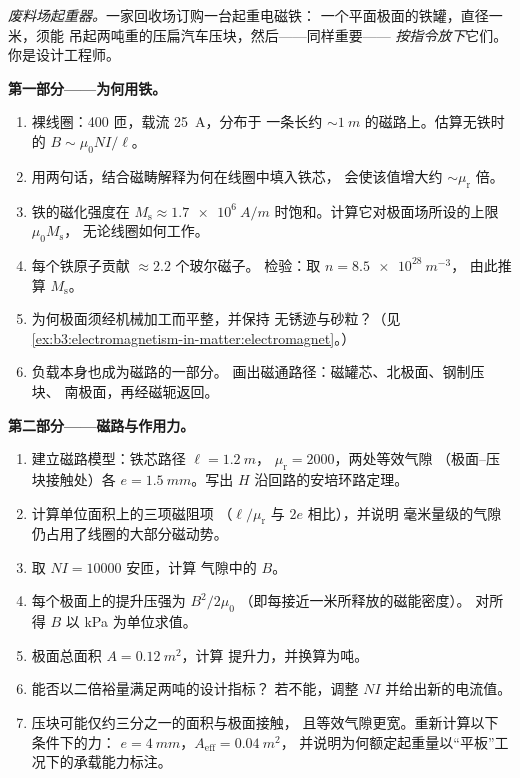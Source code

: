 \begin{problem}\label{pb:b3:electromagnetism-in-matter:1}
\emph{废料场起重器。}一家回收场订购一台起重电磁铁：
一个平面极面的铁罐，直径一米，须能
吊起两吨重的压扁汽车压块，然后——同样重要——
\emph{按指令放下}它们。你是设计工程师。

\medskip\noindent\textbf{第一部分——为何用铁。}

\begin{enumerate}
  \item 裸线圈：400 匝，载流 \qty{25}{A}，分布于
        一条长约 $\sim\qty{1}{m}$ 的磁路上。估算无铁时的 $B \sim
        \mu_0NI/\ell$。
  \item 用两句话，结合磁畴解释为何在线圈中填入铁芯，
        会使该值增大约 $\sim\mu_{\text{r}}$ 倍。
  \item 铁的磁化强度在 $M_{\text{s}} \approx
        \qty{1.7e6}{A/m}$ 时饱和。计算它对极面场所设的上限 $\mu_0M_{\text{s}}$，
        无论线圈如何工作。
  \item 每个铁原子贡献 $\approx 2.2$ 个玻尔磁子。
        检验：取 $n = \qty{8.5e28}{m^{-3}}$，
        由此推算 $M_{\text{s}}$。
  \item 为何极面须经机械加工而平整，并保持
        无锈迹与砂粒？（见
        \cref{ex:b3:electromagnetism-in-matter:electromagnet}。）
  \item 负载本身也成为磁路的一部分。
        画出磁通路径：磁罐芯、北极面、钢制压块、
        南极面，再经磁轭返回。
\end{enumerate}

\medskip\noindent\textbf{第二部分——磁路与作用力。}

\begin{enumerate}[resume]
  \item 建立磁路模型：铁芯路径 $\ell = \qty{1.2}{m}$，
        $\mu_{\text{r}} = 2000$，两处等效气隙
        （极面–压块接触处）各 $e = \qty{1.5}{mm}$。写出
        $H$ 沿回路的安培环路定理。
  \item 计算单位面积上的三项磁阻项
        （$\ell/\mu_{\text{r}}$ 与 $2e$ 相比），并说明
        毫米量级的气隙仍占用了线圈的大部分磁动势。
  \item 取 $NI = \num{10000}$ 安匝，计算
        气隙中的 $B$。
  \item 每个极面上的提升压强为 $B^2/2\mu_0$
        （即每接近一米所释放的磁能密度）。
        对所得 $B$ 以 \unit{kPa} 为单位求值。
  \item 极面总面积 $A = \qty{0.12}{m^2}$，计算
        提升力，并换算为吨。
  \item 能否以二倍裕量满足两吨的设计指标？
        若不能，调整 $NI$ 并给出新的电流值。
  \item 压块可能仅约三分之一的面积与极面接触，
        且等效气隙更宽。重新计算以下条件下的力：
        $e = \qty{4}{mm}$，$A_{\text{eff}} = \qty{0.04}{m^2}$，
        并说明为何额定起重量以“平板”工况下的承载能力标注。
\end{enumerate}


\end{problem}
